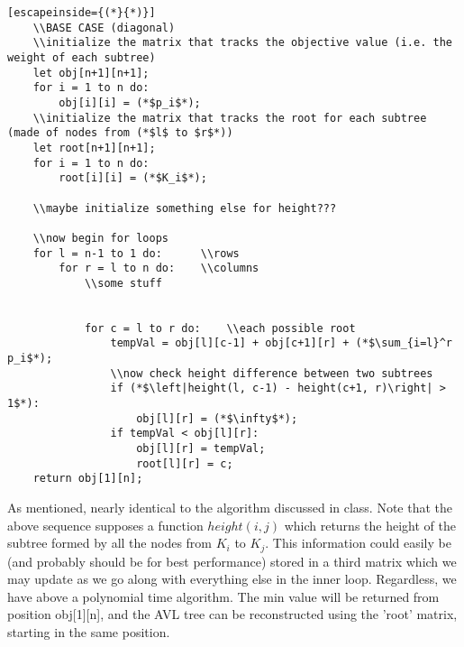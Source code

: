 \documentclass{article}
\begin{document}
\begin{lstlisting}[escapeinside={(*}{*)}]
    \\BASE CASE (diagonal)
    \\initialize the matrix that tracks the objective value (i.e. the weight of each subtree)
    let obj[n+1][n+1];
    for i = 1 to n do:
        obj[i][i] = (*$p_i$*);
    \\initialize the matrix that tracks the root for each subtree (made of nodes from (*$l$ to $r$*))
    let root[n+1][n+1];
    for i = 1 to n do:
        root[i][i] = (*$K_i$*);

    \\maybe initialize something else for height???

    \\now begin for loops
    for l = n-1 to 1 do:      \\rows
        for r = l to n do:    \\columns
            \\some stuff


            for c = l to r do:    \\each possible root
                tempVal = obj[l][c-1] + obj[c+1][r] + (*$\sum_{i=l}^r p_i$*);
                \\now check height difference between two subtrees
                if (*$\left|height(l, c-1) - height(c+1, r)\right| > 1$*):
                    obj[l][r] = (*$\infty$*);
                if tempVal < obj[l][r]:
                    obj[l][r] = tempVal;
                    root[l][r] = c;
    return obj[1][n];
\end{lstlisting}

As mentioned, nearly identical to the algorithm discussed in class. Note that the above sequence supposes a function $height(i, j)$ which returns the height of the subtree formed by all the nodes from $K_i$ to $K_j$. This information could easily be (and probably should be for best performance) stored in a third matrix which we may update as we go along with everything else in the inner loop. Regardless, we have above a polynomial time algorithm. The min value will be returned from position obj[1][n], and the AVL tree can be reconstructed using the 'root' matrix, starting in the same position.
\end{document}
